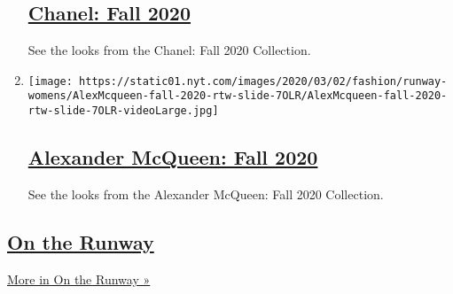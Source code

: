 \begin{enumerate}
{  \subsection{\texorpdfstring{\href{/slideshow/2020/03/03/fashion/runway-womens/chanel-fall-2020.html}{Chanel:
  Fall 2020}}{Chanel: Fall 2020}}\label{chanel-fall-2020}}

  See the looks from the Chanel: Fall 2020 Collection.
\item
  \texttt{[image: https://static01.nyt.com/images/2020/03/02/fashion/runway-womens/AlexMcqueen-fall-2020-rtw-slide-7OLR/AlexMcqueen-fall-2020-rtw-slide-7OLR-videoLarge.jpg]}

  \hypertarget{alexander-mcqueen-fall-2020}{%
  \subsection{\texorpdfstring{\href{/slideshow/2020/03/02/fashion/runway-womens/alexander-mcqueen-fall-2020.html}{Alexander
  McQueen: Fall
  2020}}{Alexander McQueen: Fall 2020}}\label{alexander-mcqueen-fall-2020}}

  See the looks from the Alexander McQueen: Fall 2020 Collection.
\end{enumerate}

\hypertarget{on-the-runway}{%
\subsection{\texorpdfstring{\href{/column/on-the-runway}{On the
Runway}}{On the Runway}}\label{on-the-runway}}

\href{/column/on-the-runway}{More in On the Runway »}

